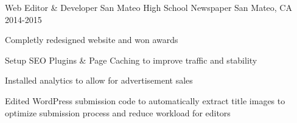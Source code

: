 \begin{cventries}

  \cventry
    {Web Editor \& Developer}
    {San Mateo High School Newspaper}
    {San Mateo, CA}
    {2014-2015}
    {
      \begin{cvitems}
        \item {Completly redesigned website and won awards}
        \item {Setup SEO Plugins \& Page Caching to improve traffic and stability}
        \item {Installed analytics to allow for advertisement sales}
        \item {Edited WordPress submission code to automatically extract title images to optimize submission process and reduce workload for editors}
      \end{cvitems}
    }
\end{cventries}
